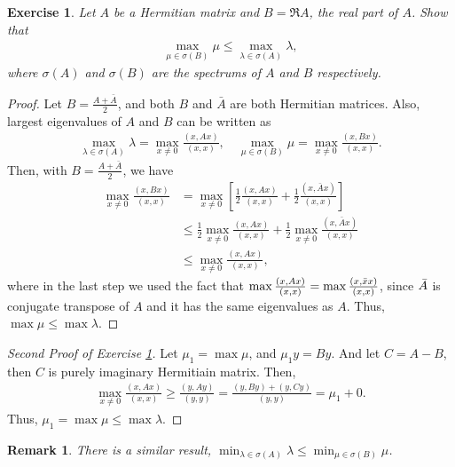 \documentclass[11pt]{article}
\newtheorem{exercise}{Exercise}[section]
\newtheorem{remark}{Remark}[section]
\theoremstyle{definition}
\numberwithin{equation}{subsection}
\begin{document}
\begin{exercise}\label{aug_2018_1}
Let $A$ be a Hermitian matrix and $B = \Re A$, the real part of $A$. Show that
\begin{align*}
    \max_{\mu \in \sigma(B)} \mu \leq \max_{\lambda \in \sigma(A)} \lambda,
\end{align*}
where $\sigma(A)$ and $\sigma(B)$ are the spectrums of $A$ and $B$ respectively.
\end{exercise}
\begin{proof}
Let $B = \frac{A + \bar{A}}{2}$, and both $B$ and $\bar{A}$ are both Hermitian matrices. Also, largest eigenvalues of $A$ and $B$ can be written as
\begin{align*}
    \max_{\lambda \in \sigma(A)} \lambda = \max_{x \neq 0} \frac{(x, Ax)}{(x,x)}, \quad \max_{\mu \in \sigma(B)} \mu = \max_{x \neq 0} \frac{(x, Bx)}{(x,x)}.
\end{align*}
Then, with $B = \frac{A + \bar{A}}{2}$, we have
\begin{align*}
    \max_{x \neq 0} \frac{(x, Bx)}{(x,x)} & = \max_{x \neq 0} \left[\frac{1}{2} \frac{(x, Ax)}{(x,x)} + \frac{1}{2} \frac{(x, \bar{A}x)}{(x,x)} \right] \\
    & \leq \frac{1}{2} \max_{x \neq 0} \frac{(x, Ax)}{(x,x)} + \frac{1}{2} \max_{x \neq 0} \frac{(x, \bar{A}x)}{(x,x)} \\
    & \leq \max_{x \neq 0} \frac{(x, Ax)}{(x,x)},
\end{align*}
where in the last step we used the fact that $\max \frac{(x, Ax)}{(x,x)} = \max \frac{(x, \Bar{x}x)}{(x,x)}$, since $\Bar{A}$ is conjugate transpose of $A$ and it has the same eigenvalues as $A$. Thus, $\max \mu \leq \max \lambda$.
\end{proof}

\begin{proof}[Second Proof of Exercise \ref{aug_2018_1}]
Let $\mu_1 = \max \mu$, and $\mu_1 y = By$. And let $C = A - B$, then $C$ is purely imaginary Hermitiain matrix. Then,
\begin{align*}
    \max_{x \neq 0} \frac{(x, Ax)}{(x,x)} \geq \frac{(y, Ay)}{(y,y)} = \frac{(y, By) + (y, Cy)}{(y,y)} = \mu_1 + 0.
\end{align*}
Thus, $\mu_1 = \max \mu \leq \max \lambda$.
\end{proof}

\begin{remark}
There is a similar result, $\min_{\lambda \in \sigma(A)} \lambda \leq \min_{\mu \in \sigma(B)} \mu$.
\end{remark}
\end{document}
